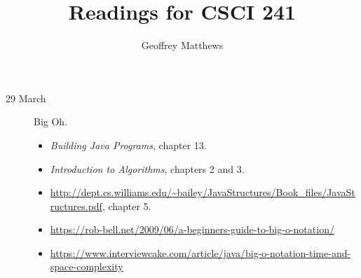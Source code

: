 \documentclass{article}
\title{Readings for CSCI 241}
\author{Geoffrey Matthews}
\begin{document}
\maketitle
\begin{description}
\item[29 March]  Big Oh.
  
  \begin{itemize}
    \item {\em Building Java Programs}, chapter 13.
    \item {\em Introduction to Algorithms}, chapters 2 and 3.
      \item \url{http://dept.cs.williams.edu/~bailey/JavaStructures/Book_files/JavaStructures.pdf}, chapter 5.
  \item \url{https://rob-bell.net/2009/06/a-beginners-guide-to-big-o-notation/}
    \item \url{https://www.interviewcake.com/article/java/big-o-notation-time-and-space-complexity}
  \end{itemize}
\end{description}
\end{document}
